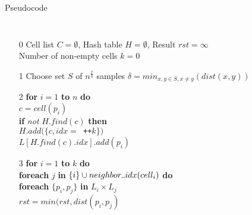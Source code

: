 \documentclass[18pt]{beamer}
\begin{document}
\begin{frame}{Pseudocode}
\begin{columns}
\begin{itemize}\itemsep0pt
\item[\footnotesize 0] Cell list $C = \emptyset$, Hash table $H = \emptyset$, Result $rst = \infty$\\
						Number of non-empty cells $k = 0$ \\
						
\vspace{5pt}
\item[\footnotesize 1] Choose set $S$ of $n^{\frac{2}{3}}$ samples
						$\delta = min_{x,y \in S, x \neq y}(dist(x, y))$
\item[\footnotesize 2] \textbf{for} $i = 1$ \textbf{to} $n$ \textbf{do} \\
						\hspace{2em}$c = cell(p_i)$ \\
						\hspace{2em}\textbf{if} \textit{not} $H.find(c)$ \textbf{then} \\
						\hspace{4em}$H.add(\{c, idx = $\texttt{ ++}$k\})$ \\
						\hspace{2em}$L[H.find(c).idx].add(p_i)$ \\
\item[\footnotesize 3] %
						\textbf{for} $i = 1$ \textbf{to} $k$ \textbf{do} \\
						\hspace{2em} \textbf{foreach} $j$ \textbf{in} $\{i\} \cup neighbor\rule{1ex}{0.4pt}idx(cell_i)$ \textbf{do} \\
						\hspace{4em} \textbf{foreach} $\{p_i,p_j\}$ \textbf{in} $L_i \times L_j$ \\
						\hspace{6em} $rst = min(rst, dist(p_i, p_j)$
\end{itemize}


\end{columns}
\end{frame}
\end{document}
